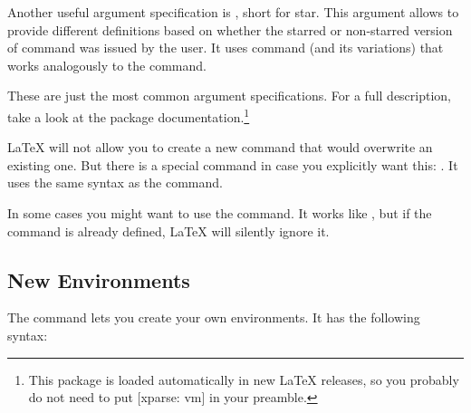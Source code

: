 
Another useful argument specification is , short for star. This
argument allows to provide different definitions based on whether the
starred or non-starred version of command was issued by the user. It uses
 command (and its variations)
that works analogously to the  command.

\begin{chktexignore}
\end{chktexignore}

These are just the most common argument specifications. For a full description,
take a look at the  package documentation.\footnote{This
  package is loaded automatically in new \LaTeX{} releases, so you probably do not
  need to put [xparse: vm] in your preamble.}

\LaTeX{} will not allow you to create a new command that would
overwrite an existing one. But there is a special command in case you
explicitly want this: .
It uses the same syntax as the 
command.

In some cases you might want to use the 
command. It works like , but if the command is
already defined, \LaTeX{} will silently ignore it.

\subsection{New Environments}
The  command lets you create your own environments. It has the
following syntax:

